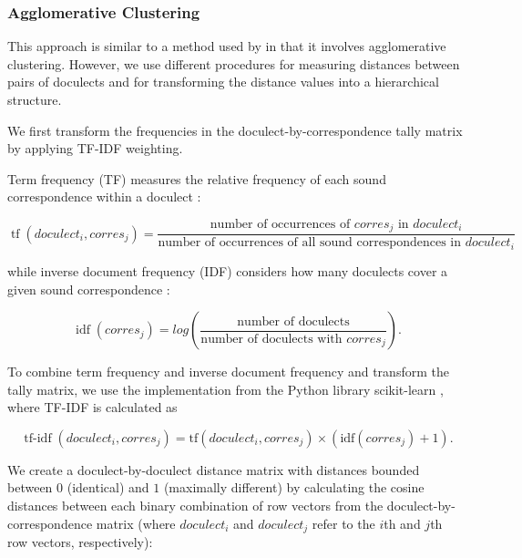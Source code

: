 \documentclass[a4paper]{article}
\begin{document}
\subsubsection{Agglomerative Clustering}
\label{subsubsec:upgma}

This approach is similar to
a method used by \citet{prokic2012detecting}
in that it involves agglomerative clustering.
However, we use different procedures for measuring
distances between pairs of doculects and
for transforming the distance values into a hierarchical structure.

We first transform the frequencies
in the doculect-by-correspondence tally matrix
by applying TF-IDF weighting.

Term frequency (TF) measures the relative frequency
of each sound correspondence within a doculect \citep{luhn1957statistical}:

\begin{adjustwidth}{-1cm}{-1cm}
\begin{equation*}
\operatorname{tf}(doculect_i, corres_j) =
\frac{\text{number of occurrences of } corres_j \text{ in } doculect_i}
{\text{number of occurrences of all sound correspondences in } doculect_i}
\end{equation*}
\end{adjustwidth}

while inverse document frequency (IDF)
considers how many doculects cover a given
sound correspondence \citep{spaerck1972statistical}:

\begin{equation*}
\operatorname{idf}(corres_j) =
log(
\frac{\text{number of doculects}}
{\text{number of doculects with } corres_j}
).
\end{equation*}

To combine term frequency and inverse document frequency
and transform the tally matrix, 
we use the implementation from the Python library scikit-learn
\citep{pedregosa2011scikit-learn},
where TF-IDF is calculated as

\begin{equation*}
\operatorname{tf-idf}(doculect_i, corres_j) =
\text{tf}(doculect_i, corres_j)
\times
(
\text{idf}(corres_j)
+ 1).
\end{equation*}

We create a doculect-by-doculect distance matrix
with distances bounded between $0$ (identical) and $1$ (maximally different)
by calculating the cosine distances between each
binary combination of row vectors from the doculect-by-correspondence matrix
(where $doculect_i$ and $doculect_j$ refer to the $i$th and $j$th row vectors, respectively):
\end{document}
